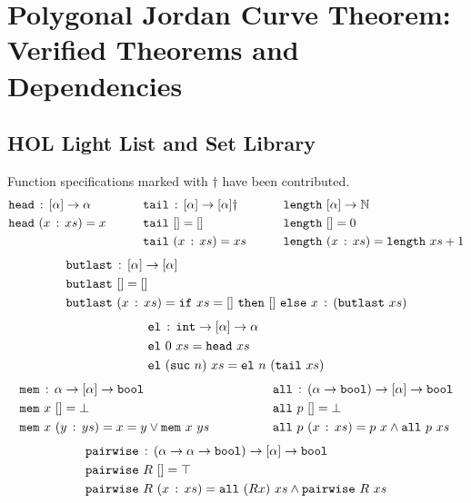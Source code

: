 \label{app:JordanVerification}
\chapter{Polygonal Jordan Curve Theorem: Verified Theorems and Dependencies}

\section{HOL Light List and Set Library}
Function specifications marked with $\dag$ have been contributed.
\begin{alignat*}{3}
  & \texttt{head}\,:\,[\alpha] \rightarrow \alpha &\qquad
  & \texttt{tail}\,:\,[\alpha] \rightarrow [\alpha]\dag &\qquad
  & \texttt{length}\ [\alpha]\rightarrow \mathbb{N}\\
  & \texttt{head}\ (x\,:\,xs) = x &\qquad
  & \texttt{tail}\ [] = [] &\qquad
  & \texttt{length}\ [] = 0\\
  & &\qquad
  &\texttt{tail}\ (x\,:\,xs) = xs &\qquad
  & \texttt{length}\ (x\,:\,xs) = \texttt{length}\ xs + 1
\end{alignat*}
\begin{align*}
  &\code{butlast}\,:\,[\alpha] \rightarrow [\alpha]\\
  &\code{butlast}\ [] = []\\
  &\code{butlast}\ (\cons{x}{xs}) = \code{if}\ xs=[]\ \code{then}\ []\ \code{else}\ \cons{x}{(\code{butlast}\ xs)}
\end{align*}
\begin{align*}
  &\texttt{el}\,:\,\texttt{int} \rightarrow [\alpha] \rightarrow \alpha\\
  &\texttt{el}\ 0\ xs = \texttt{head}\ xs\\
  &\texttt{el}\ (\texttt{suc}\ n)\ xs = \texttt{el}\ n\ (\texttt{tail}\ xs)
\end{align*}
\begin{align*}
  & \texttt{mem}\,:\,\alpha \rightarrow [\alpha] \rightarrow \texttt{bool} &\qquad\qquad
  & \texttt{all}\,:\,(\alpha\rightarrow\texttt{bool}) \rightarrow [\alpha] \rightarrow \texttt{bool}\\
  & \texttt{mem}\ x\ [] = \bot &\qquad\qquad
  & \texttt{all}\ p\ [] = \bot\\
  & \texttt{mem}\ x\ (y\,:\,ys) = x = y \vee \texttt{mem}\ x\ ys &\qquad\qquad
  & \texttt{all}\ p\ (x\,:\,xs) = p\ x \wedge \texttt{all}\ p\ xs   
\end{align*}
\begin{align*}
  & \texttt{pairwise}\,:\,(\alpha \rightarrow \alpha \rightarrow \texttt{bool}) \rightarrow [\alpha] \rightarrow \texttt{bool}\\
  & \texttt{pairwise}\ R\ [] = \top\\
  & \texttt{pairwise}\ R\ (x\,:\,xs) = \texttt{all}\ (R x)\ xs \wedge \texttt{pairwise}\ R\ xs
\end{align*}\\
